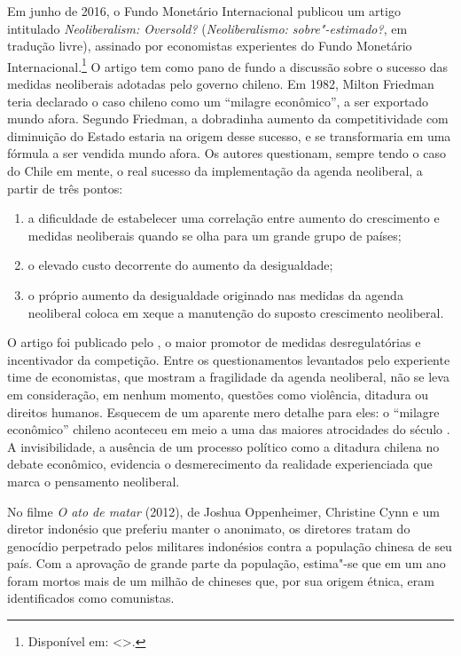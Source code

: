\asterisc

Em junho de 2016, o Fundo Monetário Internacional publicou um artigo
intitulado \emph{Neoliberalism: Oversold?} (\emph{Neoliberalismo:
sobre"-estimado?}, em tradução livre), assinado por economistas
experientes do Fundo Monetário Internacional.\footnote{Disponível em: \textless{}{}\textgreater{}.}
O artigo tem como pano de fundo a discussão sobre o sucesso das medidas
neoliberais adotadas pelo governo chileno. Em 1982, Milton Friedman
teria declarado o caso chileno como um ``milagre econômico'', a ser
exportado mundo afora. Segundo Friedman, a dobradinha aumento da
competitividade com diminuição do Estado estaria na origem desse
sucesso, e se transformaria em uma fórmula a ser vendida mundo afora.
Os autores questionam, sempre tendo o caso do Chile em mente, o real
sucesso da implementação da agenda neoliberal, a partir de três pontos:

\begin{enumerate}[label=\roman*.]
\item 
  a dificuldade de estabelecer uma correlação entre aumento do
  crescimento e medidas neoliberais quando se olha para um grande grupo
  de países;
\item 
  o elevado custo decorrente do aumento da desigualdade;
\item 
  o próprio aumento da desigualdade originado nas medidas da agenda
  neoliberal coloca em xeque a manutenção do suposto crescimento
  neoliberal.
\end{enumerate}

O artigo foi publicado pelo , o maior promotor de medidas
desregulatórias e incentivador da competição. Entre os questionamentos
levantados pelo experiente time de economistas, que mostram a
fragilidade da agenda neoliberal, não se leva em consideração, em nenhum
momento, questões como violência, ditadura ou direitos humanos.
Esquecem de um aparente mero detalhe para eles: o ``milagre econômico''
chileno aconteceu em meio a uma das maiores atrocidades do século . A
invisibilidade, a ausência de um processo político como a ditadura
chilena no debate econômico, evidencia o desmerecimento da realidade
experienciada que marca o pensamento neoliberal.

\asterisc

No filme \emph{O ato de matar} (2012), de Joshua Oppenheimer, Christine
Cynn e um diretor indonésio que preferiu manter o anonimato, os
diretores tratam do genocídio perpetrado pelos militares indonésios
contra a população chinesa de seu país. Com a aprovação de grande parte
da população, estima"-se que em um ano foram mortos mais de um milhão de
chineses que, por sua origem étnica, eram identificados como comunistas.

